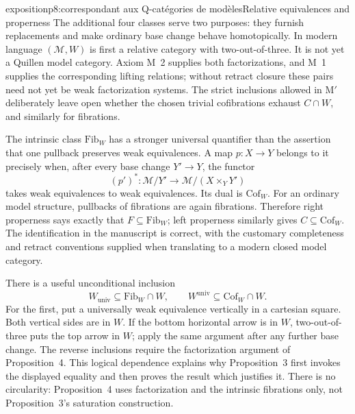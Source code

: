 \begin{dcomment}{exposition}{p8:correspondant aux Q-catégories de modèles}{Relative equivalences and properness}
The additional four classes serve two purposes: they furnish replacements and make ordinary base change behave homotopically. In modern language $(\mathcal M,W)$ is first a relative category with two-out-of-three. It is not yet a Quillen model category. Axiom M~2 supplies both factorizations, and M~1 supplies the corresponding lifting relations; without retract closure these pairs need not yet be weak factorization systems. The strict inclusions allowed in M$'$ deliberately leave open whether the chosen trivial cofibrations exhaust $C\cap W$, and similarly for fibrations.

The intrinsic class $\mathrm{Fib}_W$ has a stronger universal quantifier than the assertion that one pullback preserves weak equivalences. A map $p:X\to Y$ belongs to it precisely when, after every base change $Y'\to Y$, the functor
\[
 (p')^*:\mathcal M/Y'\longrightarrow\mathcal M/(X\times_Y Y')
\]
takes weak equivalences to weak equivalences. Its dual is $\mathrm{Cof}_W$. For an ordinary model structure, pullbacks of fibrations are again fibrations. Therefore right properness says exactly that $F\subseteq\mathrm{Fib}_W$; left properness similarly gives $C\subseteq\mathrm{Cof}_W$. The identification in the manuscript is correct, with the customary completeness and retract conventions supplied when translating to a modern closed model category.

There is a useful unconditional inclusion
\[
 W_{\mathrm{univ}}\subseteq\mathrm{Fib}_W\cap W,
 \qquad
 W^{\mathrm{univ}}\subseteq\mathrm{Cof}_W\cap W.
\]
For the first, put a universally weak equivalence vertically in a cartesian square. Both vertical sides are in $W$. If the bottom horizontal arrow is in $W$, two-out-of-three puts the top arrow in $W$; apply the same argument after any further base change. The reverse inclusions require the factorization argument of Proposition~4. This logical dependence explains why Proposition~3 first invokes the displayed equality and then proves the result which justifies it. There is no circularity: Proposition~4 uses factorization and the intrinsic fibrations only, not Proposition~3's saturation construction.
\end{dcomment}

